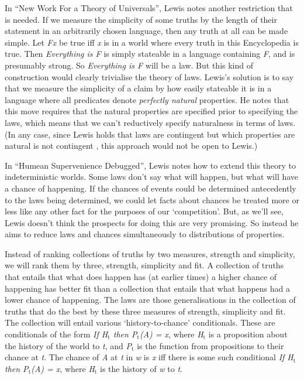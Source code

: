 In ``New Work For a Theory of Universals'', Lewis notes another restriction that is needed. If we measure the simplicity of some truths by the length of their statement in an arbitrarily chosen language, then any truth at all can be made simple. Let \textit{Fx} be true iff \textit{x} is in a world where every truth in this Encyclopedia is true. Then \textit{Everything is F} is simply stateable in a language containing \textit{F}, and is presumably strong. So \textit{Everything is F} will be a law. But this kind of construction would clearly trivialise the theory of laws. Lewis's solution is to say that we measure the simplicity of a claim by how easily stateable it is in a language where all predicates denote \textit{perfectly natural} properties. He notes that this move requires that the natural properties are specified prior to specifying the laws, which means that we can't reductively specify naturalness in terms of laws. (In any case, since Lewis holds that laws are contingent \citeyearpar[91]{Lewis1986a} but which properties are natural is not contingent \citeyearpar[60n]{Lewis1986a}, this approach would not be open to Lewis.)

In ``Humean Supervenience Debugged'', Lewis notes how to extend this theory to indeterministic worlds. Some laws don't say what will happen, but what will have a chance of happening. If the chances of events could be determined antecedently to the laws being determined, we could let facts about chances be treated more or less like any other fact for the purposes of our `competition'. But, as we'll see, Lewis doesn't think the prospects for doing this are very promising. So instead he aims to reduce laws and chances simultaneously to distributions of properties.

Instead of ranking collections of truths by two measures, strength and simplicity, we will rank them by three, strength, simplicity and fit. A collection of truths that entails that what does happen has (at earlier times) a higher chance of happening has better fit than a collection that entails that what happens had a lower chance of happening. The laws are those generalisations in the collection of truths that do the best by these three measures of strength, simplicity and fit. The collection will entail various `history-to-chance' conditionals. These are conditionals of the form \textit{If H\(_\text{t}\) then P\(_\text{t}\)(A) = x}, where \textit{H\(_\text{t}\)} is a proposition about the history of the world to \textit{t}, and \textit{P\(_\text{t}\)} is the function from propositions to their chance at \textit{t}. The chance of \textit{A} at \textit{t} in \textit{w} is \textit{x} iff there is some such conditional \textit{If H\(_\text{t}\) then P\(_\text{t}\)(A) = x}, where \textit{H\(_\text{t}\)} is the history of \textit{w} to \textit{t}.


